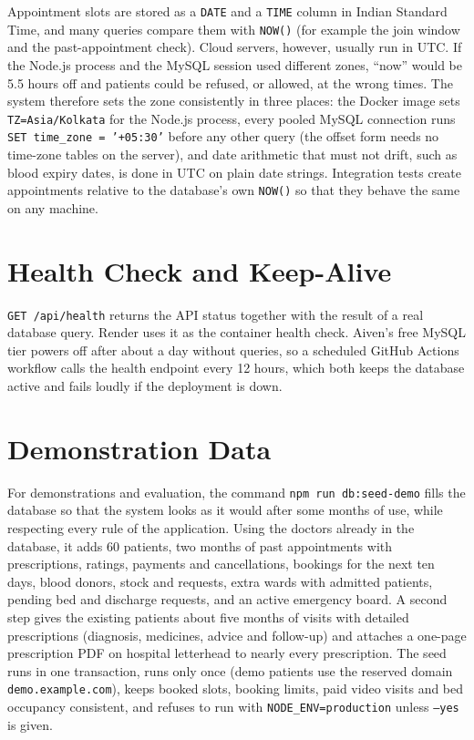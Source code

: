 Appointment slots are stored as a \texttt{DATE} and a \texttt{TIME} column in Indian Standard Time, and many queries compare them with \texttt{NOW()} (for example the join window and the past-appointment check). Cloud servers, however, usually run in UTC. If the Node.js process and the MySQL session used different zones, ``now'' would be 5.5 hours off and patients could be refused, or allowed, at the wrong times. The system therefore sets the zone consistently in three places: the Docker image sets \texttt{TZ=Asia/Kolkata} for the Node.js process, every pooled MySQL connection runs \texttt{SET time\_zone = '+05:30'} before any other query (the offset form needs no time-zone tables on the server), and date arithmetic that must not drift, such as blood expiry dates, is done in UTC on plain date strings. Integration tests create appointments relative to the database's own \texttt{NOW()} so that they behave the same on any machine.

\FloatBarrier
\section{Health Check and Keep-Alive}

\texttt{GET /api/health} returns the API status together with the result of a real database query. Render uses it as the container health check. Aiven's free MySQL tier powers off after about a day without queries, so a scheduled GitHub Actions workflow calls the health endpoint every 12 hours, which both keeps the database active and fails loudly if the deployment is down.

\FloatBarrier
\section{Demonstration Data}

For demonstrations and evaluation, the command \texttt{npm run db:seed-demo} fills the database so that the system looks as it would after some months of use, while respecting every rule of the application. Using the doctors already in the database, it adds 60 patients, two months of past appointments with prescriptions, ratings, payments and cancellations, bookings for the next ten days, blood donors, stock and requests, extra wards with admitted patients, pending bed and discharge requests, and an active emergency board. A second step gives the existing patients about five months of visits with detailed prescriptions (diagnosis, medicines, advice and follow-up) and attaches a one-page prescription PDF on hospital letterhead to nearly every prescription. The seed runs in one transaction, runs only once (demo patients use the reserved domain \texttt{demo.example.com}), keeps booked slots, booking limits, paid video visits and bed occupancy consistent, and refuses to run with \texttt{NODE\_ENV=production} unless \texttt{--yes} is given.

